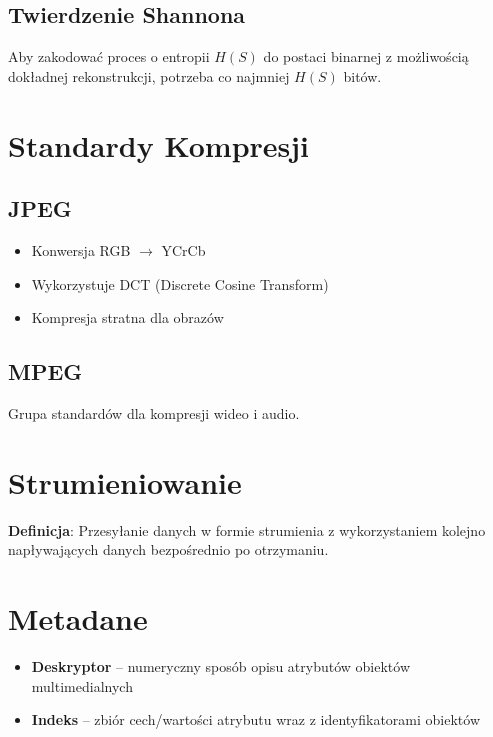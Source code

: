\subsection{Twierdzenie Shannona}
Aby zakodować proces o entropii $H(S)$ do postaci binarnej z możliwością dokładnej rekonstrukcji, potrzeba co najmniej $H(S)$ bitów.

\section{Standardy Kompresji}

\subsection{JPEG}
\begin{itemize}[noitemsep]
    \item Konwersja RGB $\rightarrow$ YCrCb
    \item Wykorzystuje DCT (Discrete Cosine Transform)
    \item Kompresja stratna dla obrazów
\end{itemize}

\subsection{MPEG}
Grupa standardów dla kompresji wideo i audio.

\section{Strumieniowanie}
\textbf{Definicja}: Przesyłanie danych w formie strumienia z wykorzystaniem kolejno napływających danych bezpośrednio po otrzymaniu.

\section{Metadane}
\begin{itemize}[noitemsep]
    \item \textbf{Deskryptor} -- numeryczny sposób opisu atrybutów obiektów multimedialnych
    \item \textbf{Indeks} -- zbiór cech/wartości atrybutu wraz z identyfikatorami obiektów
\end{itemize}

